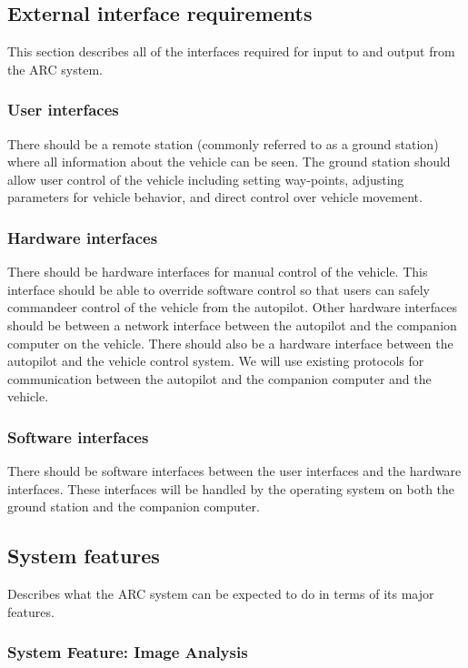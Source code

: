 \documentclass[compsoc,draftclsnofoot,onecolumn,10pt]{IEEEtran}
\begin{document}
\subsection{External interface requirements}
This section describes all of the interfaces required for input to and output
from the ARC system.
	\subsubsection{User interfaces}
	There should be a remote station (commonly referred to as a ground station) where all information about the vehicle can be seen.
	The ground station should allow user control of the vehicle including setting way-points, adjusting parameters for vehicle behavior, and direct control over vehicle movement.
	
	\subsubsection{Hardware interfaces}
	There should be hardware interfaces for manual control of the vehicle. 
	This interface should be able to override software control so that users can safely commandeer control of the vehicle from the autopilot. 
	Other hardware interfaces should be between a network interface between the autopilot and the companion computer on the vehicle.
	There should also be a hardware interface between the autopilot and the vehicle control system.
	We will use existing protocols for communication between the autopilot and the companion computer and the vehicle.

	\subsubsection{Software interfaces}
	There should be software interfaces between the user interfaces and the hardware interfaces. These interfaces will be handled by the operating system on both the ground station and the companion computer.

\subsection{System features}
Describes what the ARC system can be expected to do in terms of its major features.

\subsubsection{System Feature: Image Analysis}
	
\end{document}
